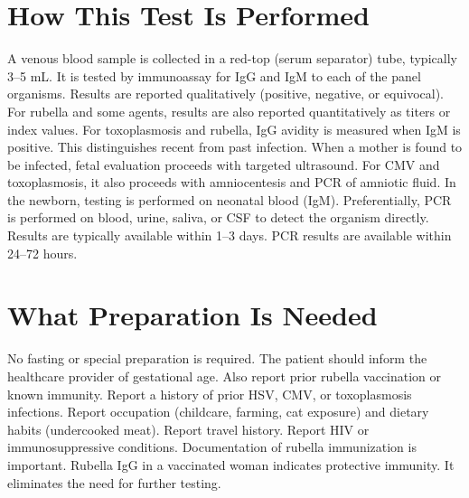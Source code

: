 \section*{How This Test Is Performed}
A venous blood sample is collected in a red-top (serum separator) tube, typically 3--5 mL. It is tested by immunoassay for IgG and IgM to each of the panel organisms. Results are reported qualitatively (positive, negative, or equivocal). For rubella and some agents, results are also reported quantitatively as titers or index values. For toxoplasmosis and rubella, IgG avidity is measured when IgM is positive. This distinguishes recent from past infection. When a mother is found to be infected, fetal evaluation proceeds with targeted ultrasound. For CMV and toxoplasmosis, it also proceeds with amniocentesis and PCR of amniotic fluid. In the newborn, testing is performed on neonatal blood (IgM). Preferentially, PCR is performed on blood, urine, saliva, or CSF to detect the organism directly. Results are typically available within 1--3 days. PCR results are available within 24--72 hours.

\section*{What Preparation Is Needed}
No fasting or special preparation is required. The patient should inform the healthcare provider of gestational age. Also report prior rubella vaccination or known immunity. Report a history of prior HSV, CMV, or toxoplasmosis infections. Report occupation (childcare, farming, cat exposure) and dietary habits (undercooked meat). Report travel history. Report HIV or immunosuppressive conditions. Documentation of rubella immunization is important. Rubella IgG in a vaccinated woman indicates protective immunity. It eliminates the need for further testing.

